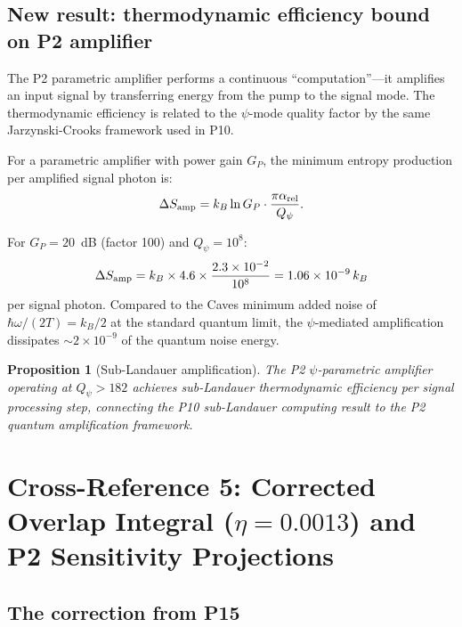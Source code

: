 \documentclass[11pt,twocolumn]{article}
\newtheorem{proposition}{Proposition}
\begin{document}
\subsection{New result: thermodynamic efficiency bound on P2 amplifier}

The P2 parametric amplifier performs a continuous ``computation''---it
amplifies an input signal by transferring energy from the pump to the
signal mode. The thermodynamic efficiency is related to the $\psi$-mode
quality factor by the same Jarzynski-Crooks framework used in P10.

For a parametric amplifier with power gain $G_P$, the minimum entropy
production per amplified signal photon is:
\begin{equation}
\Delta S_{\rm amp} = k_B \ln G_P \cdot \frac{\pi\alpha_{\rm rel}}{Q_\psi}.
\label{eq:amp_entropy}
\end{equation}

For $G_P = 20$~dB (factor 100) and $Q_\psi = 10^8$:
\begin{equation}
\Delta S_{\rm amp} = k_B \times 4.6 \times \frac{2.3\times10^{-2}}{10^8}
= 1.06\times10^{-9}\,k_B
\end{equation}
per signal photon. Compared to the Caves minimum added noise of
$\hbar\omega/(2T) = k_B/2$ at the standard quantum limit, the $\psi$-mediated
amplification dissipates $\sim 2\times10^{-9}$ of the quantum noise energy.

\begin{proposition}[Sub-Landauer amplification]
The P2 $\psi$-parametric amplifier operating at $Q_\psi > 182$ achieves
sub-Landauer thermodynamic efficiency \emph{per signal processing step},
connecting the P10 sub-Landauer computing result to the P2 quantum
amplification framework.
\end{proposition}


\section{Cross-Reference 5: Corrected Overlap Integral
($\eta = 0.0013$) and P2 Sensitivity Projections}
\label{sec:overlap}

\subsection{The correction from P15}
\end{document}
